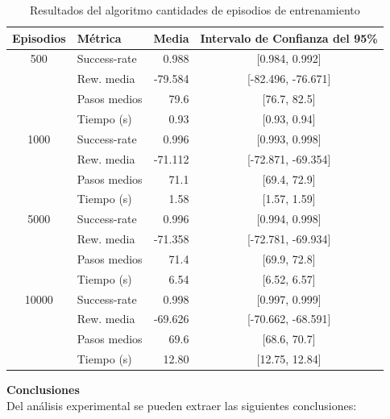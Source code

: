 \begin{table}[h!]
    \centering
    \begin{tabular}{|c|l|r|c|}
    \hline
    Episodios & Métrica        & Media    & Intervalo de Confianza del 95\% \\
    \hline
    500   & Success-rate  & 0.988   & [0.984, 0.992] \\
          & Rew. media    & -79.584 & [-82.496, -76.671] \\
          & Pasos medios  & 79.6    & [76.7, 82.5] \\
          & Tiempo (s)    & 0.93    & [0.93, 0.94] \\
    \hline
    1000  & Success-rate  & 0.996   & [0.993, 0.998] \\
          & Rew. media    & -71.112 & [-72.871, -69.354] \\
          & Pasos medios  & 71.1    & [69.4, 72.9] \\
          & Tiempo (s)    & 1.58    & [1.57, 1.59] \\
    \hline
    5000  & Success-rate  & 0.996   & [0.994, 0.998] \\
          & Rew. media    & -71.358 & [-72.781, -69.934] \\
          & Pasos medios  & 71.4    & [69.9, 72.8] \\
          & Tiempo (s)    & 6.54    & [6.52, 6.57] \\
    \hline
    10000 & Success-rate  & 0.998   & [0.997, 0.999] \\
          & Rew. media    & -69.626 & [-70.662, -68.591] \\
          & Pasos medios  & 69.6    & [68.6, 70.7] \\
          & Tiempo (s)    & 12.80   & [12.75, 12.84] \\
    \hline
    \end{tabular}
    \caption{Resultados del algoritmo cantidades de episodios de entrenamiento}
    \label{tab:qlearning_episodios}
\end{table}
    
\newpage
\textbf{Conclusiones}
\\

Del análisis experimental se pueden extraer las siguientes conclusiones:

